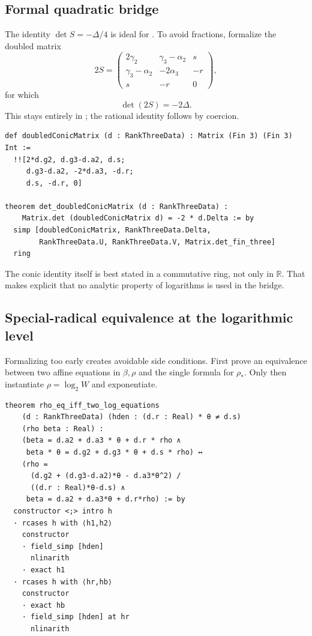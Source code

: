 \documentclass[11pt,oneside]{article}
\theoremstyle{research}
\theoremstyle{definition}
\newcommand{\R}{\mathbb R}
\newcommand{\code}[1]{\texttt{\detokenize{#1}}}
\begin{document}
\subsection{Formal quadratic bridge}

The identity $\det S=-\Delta/4$ is ideal for \code{ring_nf}.  To avoid fractions,
formalize the doubled matrix
\begin{equation}
 2S=
 \begin{pmatrix}
 2\gamma_2&\gamma_3-\alpha_2&s\\
 \gamma_3-\alpha_2&-2\alpha_3&-r\\
 s&-r&0
 \end{pmatrix},
 \label{eq:doubled-S}
\end{equation}
for which
\begin{equation}
 \det(2S)=-2\Delta.
 \label{eq:doubled-S-det}
\end{equation}
This stays entirely in \code{Int}; the rational identity follows by coercion.

\begin{lstlisting}[language={},caption={Integer version of the formal-conic
determinant.}]
def doubledConicMatrix (d : RankThreeData) : Matrix (Fin 3) (Fin 3) Int :=
  !![2*d.g2, d.g3-d.a2, d.s;
     d.g3-d.a2, -2*d.a3, -d.r;
     d.s, -d.r, 0]

theorem det_doubledConicMatrix (d : RankThreeData) :
    Matrix.det (doubledConicMatrix d) = -2 * d.Delta := by
  simp [doubledConicMatrix, RankThreeData.Delta,
        RankThreeData.U, RankThreeData.V, Matrix.det_fin_three]
  ring
\end{lstlisting}

The conic identity itself is best stated in a commutative ring, not only in
$\R$.  That makes explicit that no analytic property of logarithms is used in
the bridge.

\subsection{Special-radical equivalence at the logarithmic level}

Formalizing \code{Real.rpow} too early creates avoidable side conditions.  First
prove an equivalence between two affine equations in $\beta,\rho$ and the
single formula for $\rho_*$.  Only then instantiate
$\rho=\log_2 W$ and exponentiate.

\begin{lstlisting}[language={},caption={Linear-algebra core of the special
radical reduction.}]
theorem rho_eq_iff_two_log_equations
    (d : RankThreeData) (hden : (d.r : Real) * θ ≠ d.s)
    (rho beta : Real) :
    (beta = d.a2 + d.a3 * θ + d.r * rho ∧
     beta * θ = d.g2 + d.g3 * θ + d.s * rho) ↔
    (rho =
      (d.g2 + (d.g3-d.a2)*θ - d.a3*θ^2) /
      ((d.r : Real)*θ-d.s) ∧
     beta = d.a2 + d.a3*θ + d.r*rho) := by
  constructor <;> intro h
  · rcases h with ⟨h1,h2⟩
    constructor
    · field_simp [hden]
      nlinarith
    · exact h1
  · rcases h with ⟨hr,hb⟩
    constructor
    · exact hb
    · field_simp [hden] at hr
      nlinarith
\end{lstlisting}
\end{document}

